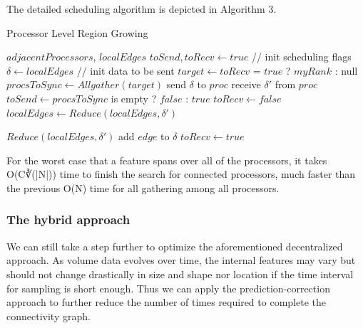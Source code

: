 \documentclass[10pt, conference, compsocconf]{IEEEtran}
\begin{document}
The detailed scheduling algorithm is depicted in Algorithm 3. 
\begin{algorithm}
\caption{Processor Level Region Growing}
\begin{algorithmic}[1]
\REQUIRE $adjacentProcessors$, $localEdges$
\STATE $toSend, toRecv \leftarrow true$	// init scheduling flags
\STATE $\delta \leftarrow localEdges$	// init data to be sent
	\STATE $target \leftarrow toRecv$ = $true$ ? $myRank$ : null
	\STATE $procsToSync \leftarrow Allgather(target)$
			\STATE send $\delta$ to $proc$
		\ENDIF
			\STATE receive $\delta\prime$ from $proc$
		\ENDIF
	\ENDFOR
	\STATE $toSend \leftarrow procsToSync$ is empty ? $false$ : $true$
	\STATE $toRecv \leftarrow false$
	\STATE $localEdges \leftarrow Reduce(localEdges, \delta\prime)$
\ENDWHILE
\end{algorithmic}
\begin{algorithmic} \STATE \end{algorithmic}	%
\begin{algorithmic}[1]
\STATE $Reduce(localEdges, \delta\prime)$
			\STATE add $edge$ to $\delta$
			\STATE $toRecv \leftarrow true$
		\ENDIF
	\ENDFOR	
\end{algorithmic}
\end{algorithm}

For the worst case that a feature spans over all of the processors, it takes O(C∛(|N|)) time to finish the search for connected processors, much faster than the previous O(N) time for all gathering among all processors.

\subsubsection{The hybrid approach}
We can still take a step further to optimize the aforementioned decentralized approach. As volume data evolves over time, the internal features may vary but should not change drastically in size and shape nor location if the time interval for sampling is short enough. Thus we can apply the prediction-correction approach to further reduce the number of times required to complete the connectivity graph. 
\end{document}
